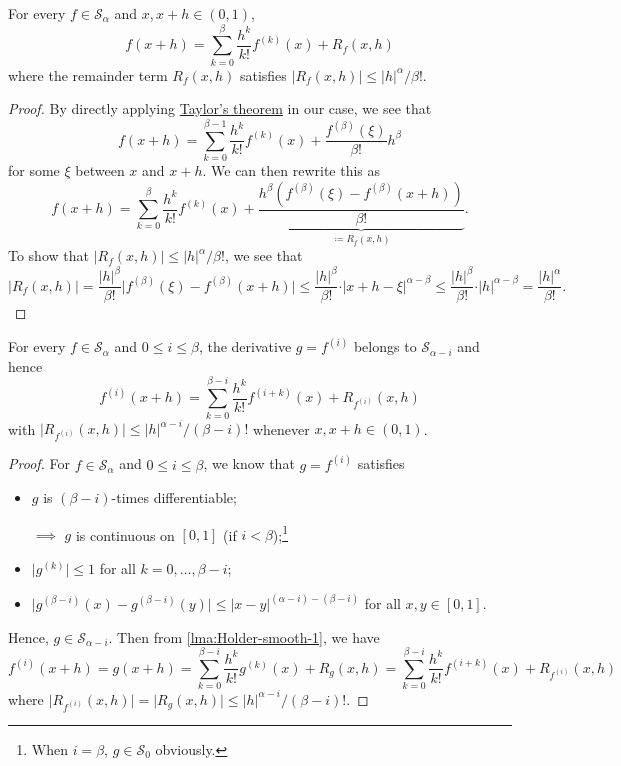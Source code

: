 \begin{lemma}\label{lma:Holder-smooth-1}
	For every \(f\in \mathcal{S} _\alpha \) and \(x, x+h \in (0, 1)\),
	\[
		f(x+h) = \sum_{k=0}^{\beta } \frac{h^k}{k!} f^{(k)}(x) + R_f(x, h)
	\]
	where the remainder term \(R_f(x, h)\) satisfies \(\vert R_f (x, h) \vert \leq \vert h \vert ^\alpha / \beta !\).
\end{lemma}
\begin{proof}
	By directly applying \hyperref[thm:Taylor]{Taylor's theorem} in our case, we see that
	\[
		f(x+h) = \sum_{k=0}^{\beta -1} \frac{h^k}{k!}f^{(k)}(x) + \frac{f^{(\beta )}(\xi )}{\beta !} h^\beta
	\]
	for some \(\xi\) between \(x\) and \(x+h\). We can then rewrite this as
	\[
		f(x+h) = \sum_{k=0}^{\beta } \frac{h^k}{k!}f^{(k)}(x) + \underbrace{\frac{h^\beta (f^{(\beta )}(\xi ) - f^{(\beta )}(x+h) )}{\beta !}}_{\coloneqq R_f(x, h)}.
	\]
	To show that \(\vert R_f(x, h) \vert \leq \vert h \vert ^\alpha / \beta !\), we see that
	\[
		\vert R_f(x, h) \vert
		= \frac{\vert h \vert ^\beta }{\beta !} \vert f^{(\beta )}(\xi ) - f^{(\beta )}(x+h) \vert
		\leq \frac{\vert h \vert ^\beta }{\beta !}\cdot \vert x+h - \xi \vert ^{\alpha - \beta }
		\leq \frac{\vert h \vert ^\beta }{\beta !}\cdot \vert h \vert ^{\alpha - \beta }
		= \frac{\vert h \vert ^\alpha }{\beta !}.
	\]
\end{proof}

\begin{lemma}\label{lma:Holder-smooth-2}
	For every \(f\in \mathcal{S} _\alpha \) and \(0 \leq i \leq \beta \), the derivative \(g = f^{(i)}\) belongs to \(\mathcal{S} _{\alpha - i}\) and hence
	\[
		f^{(i)} (x + h) = \sum_{k=0}^{\beta - i} \frac{h^k}{k!}f^{(i+k)}(x) + R_{f^{(i)}}(x, h)
	\]
	with \(\vert R_{f^{(i)}} (x, h) \vert \leq \vert h \vert ^{\alpha - i} / (\beta - i)!\) whenever \(x, x+h\in (0, 1)\).
\end{lemma}
\begin{proof}
	For \(f\in \mathcal{S} _\alpha \) and \(0 \leq i \leq \beta \), we know that \(g = f^{(i)}\) satisfies
	\begin{itemize}
		\item \(g\) is \((\beta - i)\)-times differentiable;
		\item[\(\implies \)] \(g\) is continuous on \([0, 1]\) (if \(i < \beta \));\footnote{When \(i = \beta \), \(g\in \mathcal{S} _0\) obviously.}
		\item \(\vert g^{(k)} \vert \leq 1\) for all \(k = 0, \dots , \beta - i\);
		\item \(\vert g^{(\beta - i)} (x) - g^{(\beta - i)}(y)\vert \leq \vert x - y \vert ^{(\alpha - i) - (\beta - i)}\) for all \(x, y\in [0, 1]\).
	\end{itemize}
	Hence, \(g \in \mathcal{S} _{\alpha - i}\). Then from \autoref{lma:Holder-smooth-1}, we have
	\[
		f^{(i)}(x+h) = g(x+h)
		= \sum_{k=0}^{\beta - i}\frac{h^k}{k!} g^{(k)}(x) + R_g(x, h)
		= \sum_{k=0}^{\beta - i} \frac{h^k}{k!} f^{(i+k)}(x) + R_{f^{(i)}}(x, h)
	\]
	where \(\vert R_{f^{(i)}} (x, h)\vert = \vert R_g(x, h) \vert \leq \vert h \vert ^{\alpha - i} / (\beta - i)!\).
\end{proof}


